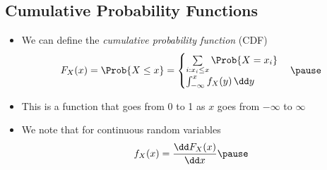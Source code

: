 
\begin{slide}
\section{Cumulative Probability Functions}
  
\begin{PauseHighLight}
  \begin{itemize}
  \item We can define the \emph{cumulative probability function} (CDF)
    \begin{align*}
      F_X(x) = \Prob{X\leq x} =
      \begin{cases}
        \sum\limits_{i: x_i\leq x} \Prob{X=x_i} \\
        \int_{-\infty}^x f_X(y) \, \dd y
      \end{cases}\pause
    \end{align*}
  \item This is a function that goes from 0 to 1 as $x$ goes from
    $-\infty$ to $\infty$\pause
  \item We note that for continuous random variables
    \begin{align*}
      f_X(x) = \frac{\dd F_X(x)}{\dd x}\pause
    \end{align*}
  \end{itemize}
\end{PauseHighLight}

\end{slide}

\Outline %

